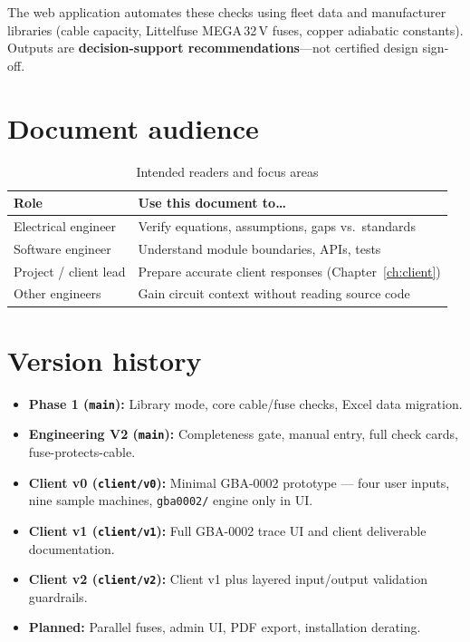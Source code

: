 \documentclass[11pt,a4paper]{report}
\begin{document}
The web application automates these checks using fleet data and manufacturer libraries (cable capacity, Littelfuse MEGA\,32\,V fuses, copper adiabatic constants). Outputs are \textbf{decision-support recommendations}---not certified design sign-off.

\section{Document audience}

\begin{table}[h]
  \centering
  \caption{Intended readers and focus areas}
  \begin{tabular}{@{}ll@{}}
    \toprule
    \textbf{Role} & \textbf{Use this document to\ldots} \\
    \midrule
    Electrical engineer & Verify equations, assumptions, gaps vs.\ standards \\
    Software engineer & Understand module boundaries, APIs, tests \\
    Project / client lead & Prepare accurate client responses (Chapter~\ref{ch:client}) \\
    Other engineers & Gain circuit context without reading source code \\
    \bottomrule
  \end{tabular}
\end{table}

\section{Version history}

\begin{itemize}[noitemsep]
  \item \textbf{Phase 1 (\texttt{main}):} Library mode, core cable/fuse checks, Excel data migration.
  \item \textbf{Engineering V2 (\texttt{main}):} Completeness gate, manual entry, full check cards, fuse-protects-cable.
  \item \textbf{Client v0 (\texttt{client/v0}):} Minimal GBA-0002 prototype --- four user inputs, nine sample machines, \texttt{gba0002/} engine only in UI.
  \item \textbf{Client v1 (\texttt{client/v1}):} Full GBA-0002 trace UI and client deliverable documentation.
  \item \textbf{Client v2 (\texttt{client/v2}):} Client v1 plus layered input/output validation guardrails.
  \item \textbf{Planned:} Parallel fuses, admin UI, PDF export, installation derating.
\end{itemize}
\end{document}

